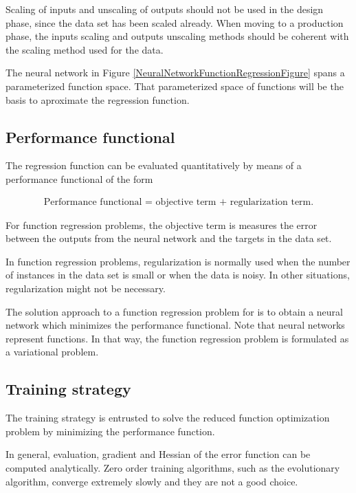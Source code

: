 Scaling of inputs and unscaling of outputs should not be used in the design phase, since the data set has been scaled already. When moving to a production phase, the inputs scaling and outputs unscaling methods should be coherent with the scaling method used for the data. 

The neural network in Figure \ref{NeuralNetworkFunctionRegressionFigure} spans a parameterized function space. 
That parameterized space of functions will be the basis to aproximate the regression function. 

\subsection*{Performance functional}

The regression function can be evaluated quantitatively by means of a performance functional of the form

\begin{eqnarray}\nonumber
\text{Performance functional = objective term + regularization term}. 
\end{eqnarray}

For function regression problems, the objective term is measures the error between the outputs from the neural network and the targets in the data set.

In function regression problems, regularization is normally used when the number of instances in the data set 
is small or when the data is noisy. In other situations, regularization might not be necessary.    
  
The solution approach to a function regression problem for is to obtain a neural network which minimizes the performance functional. 
Note that neural networks represent functions. 
In that way, the function regression problem is formulated as a variational problem.


\subsection*{Training strategy}

The training strategy is entrusted to solve the reduced function optimization problem by minimizing the performance function. 

In general, evaluation, gradient and Hessian of the error function can be computed analytically. 
Zero order training algorithms, such as the evolutionary algorithm, converge extremely slowly and they are not a good choice. 

